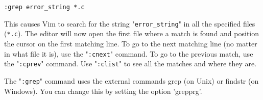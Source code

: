 \begin{Verbatim}[samepage=true]
 :grep error_string *.c
\end{Verbatim}

This causes Vim to search for the string "\verb!error_string!" in all the specified files (\verb!*.c!).
The editor will now open the first file where a match is found and position the cursor on the first matching line.
To go to the next matching line (no matter in what file it is), use the "\verb!:cnext!" command.
To go to the previous match, use the "\verb!:cprev!" command.
Use "\verb!:clist!" to see all the matches and where they are.

The "\verb!:grep!" command uses the external commands grep (on Unix) or findstr (on Windows).
You can change this by setting the option 'grepprg'.
\clearpage
